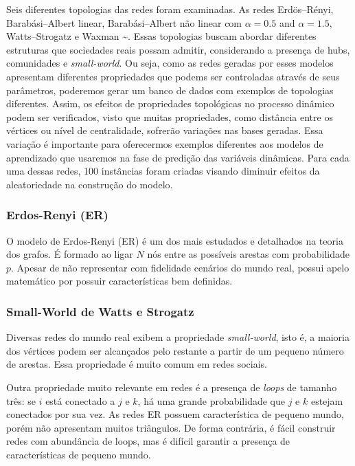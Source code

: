 Seis diferentes topologias das redes foram examinadas. As redes
Erdös--Rényi, Barabási--Albert linear, Barabási--Albert não linear com
\(\alpha=0.5\) and \(\alpha=1.5\), Watts--Strogatz e Waxman
\textasciitilde{}\cite{boccaletti2006complex,costa2007characterization}.
Essas topologias buscam abordar diferentes estruturas que sociedades
reais possam admitir, considerando a presença de hubs, comunidades e
\emph{small-world}. Ou seja, como as redes geradas por esses modelos
apresentam diferentes propriedades que podems ser controladas através de
seus parâmetros, poderemos gerar um banco de dados com exemplos de
topologias diferentes. Assim, os efeitos de propriedades topológicas no
processo dinâmico podem ser verificados, visto que muitas propriedades,
como distância entre os vértices ou nível de centralidade, sofrerão
variações nas bases geradas. Essa variação é importante para oferecermos
exemplos diferentes aos modelos de aprendizado que usaremos na fase de
predição das variáveis dinâmicas. Para cada uma dessas redes, 100
instâncias foram criadas visando diminuir efeitos da aleatoriedade na
construção do modelo.

\subsubsection{Erdos-Renyi (ER)}\label{erdos-renyi-er}

O modelo de Erdos-Renyi (ER) é um dos mais estudados e detalhados na
teoria dos grafos. É formado ao ligar \(N\) nós entre as possíveis
arestas com probabilidade \(p\). Apesar de não representar com
fidelidade cenários do mundo real, possui apelo matemático por possuir
características bem definidas.

\subsubsection{Small-World de Watts e
Strogatz}\label{small-world-de-watts-e-strogatz}

Diversas redes do mundo real exibem a propriedade \emph{small-world},
isto é, a maioria dos vértices podem ser alcançados pelo restante a
partir de um pequeno número de arestas. Essa propriedade é muito comum
em redes sociais.

Outra propriedade muito relevante em redes é a presença de \emph{loops}
de tamanho três: se \(i\) está conectado a \(j\) e \(k\), há uma grande
probabilidade que \(j\) e \(k\) estejam conectados por sua vez. As redes
ER possuem característica de pequeno mundo, porém não apresentam muitos
triângulos. De forma contrária, é fácil construir redes com abundância
de loops, mas é difícil garantir a presença de características de
pequeno mundo.

